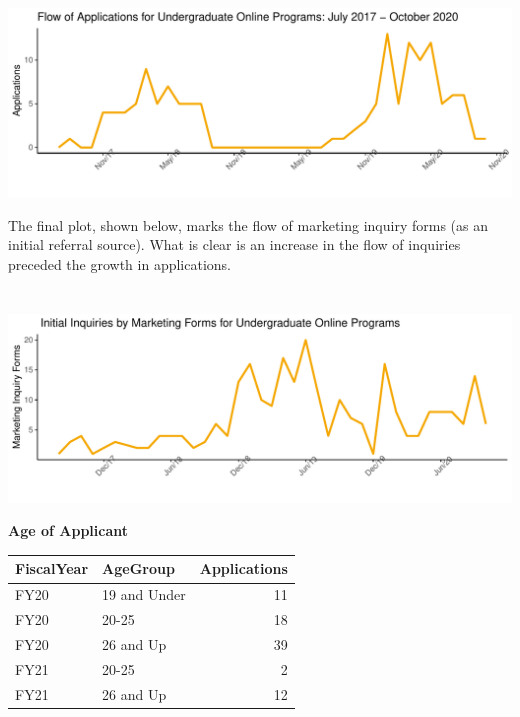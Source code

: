\documentclass[]{tufte-handout}
\begin{document}
\hypertarget{section-1}{%
\section{}\label{section-1}}

\includegraphics{FY20-Online-Application-Flow-as-of-Census-10-15-2020_files/figure-latex/unnamed-chunk-6-1}

The final plot, shown below, marks the flow of marketing inquiry forms
(as an initial referral source). What is clear is an increase in the
flow of inquiries preceded the growth in applications.

\hypertarget{section-2}{%
\section{}\label{section-2}}

\includegraphics{FY20-Online-Application-Flow-as-of-Census-10-15-2020_files/figure-latex/unnamed-chunk-7-1}

\textbf{Age of Applicant}

\begin{table}[H]
\centering
\begin{tabular}{l|l|r}
\hline
FiscalYear & AgeGroup & Applications\\
\hline
FY20 & 19 and Under & 11\\
\hline
FY20 & 20-25 & 18\\
\hline
FY20 & 26 and Up & 39\\
\hline
FY21 & 20-25 & 2\\
\hline
FY21 & 26 and Up & 12\\
\hline
\end{tabular}
\end{table}
\end{document}
